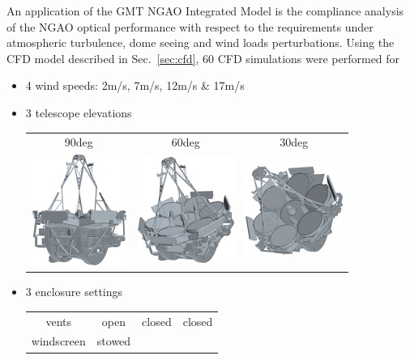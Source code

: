 \documentclass[]{AO4ELT}  %
\begin{document}
An application of the GMT NGAO Integrated Model is the compliance analysis of the NGAO optical performance with respect to the requirements under atmospheric turbulence, dome seeing and wind loads perturbations.
Using the CFD model described in Sec.~\ref{sec:cfd}, 60 CFD simulations were performed for
\begin{itemize}
   \item 4 wind speeds: 2m/s, 7m/s, 12m/s \& 17m/s
   \item 3 telescope elevations
         \begin{tabular}{ccc}
            90deg                                                             & 60deg & 30deg \\
            \includegraphics[width=0.2\linewidth]{zen00az000_OS7_tel_tr.png}  &
            \includegraphics[width=0.2\linewidth]{zen30az000_CD12_tel_tr.png} &
            \includegraphics[width=0.2\linewidth]{zen60az000_CS17_tel_tr.png}
         \end{tabular}
   \item 3 enclosure settings
         \begin{tabular}{cccc}
            vents                                                         & open                                                         &
            closed                                                        &
            closed                                                                                                                         \\
            windscreen                                                    & stowed                                                       &

\end{tabular}
\end{itemize}
\end{document}
